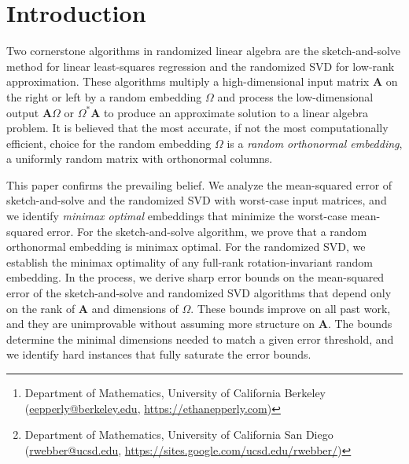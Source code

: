 \documentclass[11pt]{article}
\title{\mytitle}
\author{%
  Ethan N. Epperly%
  \thanks{Department of Mathematics, University of California Berkeley
  (\href{mailto:eepperly@berkeley.edu}{eepperly@berkeley.edu},
  \url{https://ethanepperly.com})}
  \and
  Robert J. Webber%
  \thanks{Department of Mathematics, University of California San Diego
  (\href{mailto:rwebber@ucsd.edu}{rwebber@ucsd.edu},
  \url{https://sites.google.com/ucsd.edu/rwebber/})}}
\date{\today}
\newcommand{\mat}[1]{\boldsymbol{#1}}
\theoremstyle{definition}
\numberwithin{equation}{section}
\begin{document}
\maketitle

\begin{abstract}
Two widely used randomized algorithms are the sketch-and-solve method for least-squares regression and the randomized SVD for low-rank approximation.
These algorithms apply a random embedding to compress a target matrix, and they perform computations on the compressed matrix to save computational cost.
This paper asks, what is the optimal random embedding in these algorithms?
Also, what is the sharpest possible error bound for the optimal embedding?
The paper proves that a random orthonormal matrix is minimax optimal for the sketch-and-solve algorithm while any full-rank rotation-invariant embedding is minimax optimal for the randomized SVD.
Following these results, the paper obtains the best possible error bounds for sketched least-squares and the randomized SVD.
Last, empirical experiments provide evidence of universality phenomena, in which several random embeddings lead to similar accuracy to the optimal embeddings in practice.
\end{abstract}

\section{Introduction}

Two cornerstone algorithms in randomized linear algebra are the sketch-and-solve method for linear least-squares regression \cite{DMM06,Sar06} and the randomized SVD \cite{HMT11} for low-rank approximation.
These algorithms multiply a high-dimensional input matrix $\mat{A}$ on the right or left by a random embedding $\mat{\varOmega}$ and process the low-dimensional output $\mat{A} \mat{\varOmega}$ or $\mat{\varOmega}^*\mat{A}$ to produce an approximate solution to a linear algebra problem.
It is believed that the most accurate, if not the most computationally efficient, choice for the random embedding $\mat{\varOmega}$ is a \emph{random orthonormal embedding}, a uniformly random matrix with orthonormal columns.

This paper confirms the prevailing belief.
We analyze the mean-squared error of sketch-and-solve and the randomized SVD with worst-case input matrices, and we identify \emph{minimax optimal} embeddings that minimize the worst-case mean-squared error.
For the sketch-and-solve algorithm, we prove that a random orthonormal embedding is minimax optimal.
For the randomized SVD, we establish the minimax optimality of any full-rank rotation-invariant random embedding.
In the process, we derive sharp error bounds on the mean-squared error of the sketch-and-solve and randomized SVD algorithms that depend only on the rank of $\mat{A}$ and dimensions of $\mat{\varOmega}$.
These bounds improve on all past work, and they are unimprovable without assuming more structure on $\mat{A}$.
The bounds determine the minimal dimensions needed to match a given error threshold, and we identify hard instances that fully saturate the error bounds.
\end{document}
